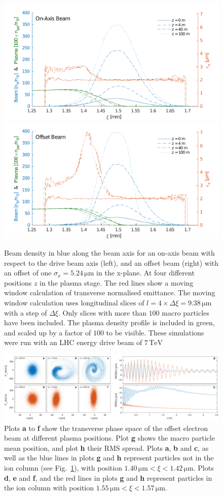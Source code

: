 \documentclass[aps,prstab,reprint,amsmath,amssymb,groupedaddress,onecolumn]{revtex4-1}
\newcommand{\unit}[1]{\,\mathrm{#1}}
\begin{document}
\begin{figure}[hbt]
    \includegraphics[width=0.495\linewidth,trim={2mm 0mm 2mm 0mm},clip]{figures/beamEmittance}
    \includegraphics[width=0.495\linewidth,trim={2mm 0mm 2mm 0mm},clip]{figures/beamEmittanceOffset}
    \caption{\label{Fig:BeamEmitt} Beam density in blue along the beam axis for an on-axis beam with respect to the
        drive beam axis (left), and an offset beam (right) with an offset of one $\sigma_{x} = 5.24\unit{\mu m}$ in the
        x-plane. At four different positions $z$ in the plasma stage. The red lines show a moving window calculation of
        transverse normalised emittance. The moving window calculation uses longitudinal slices of
        $l = 4\times\Delta\xi = 9.38\unit{\mu m}$ with a step of $\Delta\xi$. Only slices with more than $100$ macro
        particles have been included. The plasma density profile is included in green, and scaled up by a factor of
        $100$ to be visible. These simulations were run with an LHC energy drive beam of $7\unit{TeV}$}
\end{figure}

\begin{figure}[hbt]
    \includegraphics[width=\linewidth,trim={0mm 0mm 0mm 0mm},clip]{figures/beamFilamentationAll}
    \caption{\label{Fig:BeamFilament} Plots \textbf{a} to \textbf{f} show the transverse phase space of the offset
        electron beam at different plasma positions. Plot \textbf{g} shows the macro particle mean position, and plot
        \textbf{h} their RMS spread. Plots \textbf{a}, \textbf{b} and \textbf{c}, as well as the blue lines in plots
        \textbf{g} and \textbf{h} represent particles %
        not in the ion column (see Fig.~\ref{Fig:BeamEmitt}), with position $1.40\unit{\mu m} < \xi < 1.42\unit{\mu m}$. Plots
        \textbf{d}, \textbf{e} and \textbf{f}, and the red lines in plots \textbf{g} and \textbf{h} represent particles %
        in the ion column 
        with position $1.55\unit{\mu m} < \xi < 1.57\unit{\mu m}$.}
\end{figure}
\end{document}
